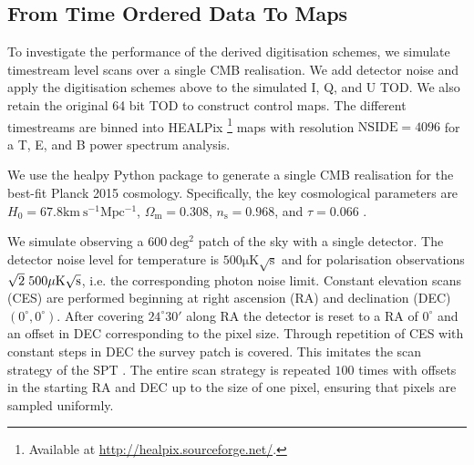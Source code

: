 \documentclass[apj]{emulateapj}
\begin{document}
\subsection{From Time Ordered Data To Maps}
\label{subsec:method}

To investigate the performance of the derived digitisation schemes, we simulate timestream level scans over a single CMB realisation. We add detector noise and apply the digitisation schemes above to the simulated I, Q, and U TOD. We also retain the original 64 bit TOD to construct control maps. The different timestreams are binned into HEALPix \citep{healpix}\footnote{Available at \url{http://healpix.sourceforge.net/}.} maps with resolution $\mathrm{NSIDE} = 4096$ for a T, E, and B power spectrum analysis.


We use the healpy Python package to generate a single CMB realisation for the best-fit Planck 2015 cosmology. Specifically, the key cosmological parameters are $H_0 = 67.8 \mathrm{km \> s^{-1} Mpc^{-1}}$, $\Omega_{\mathrm{m}} = 0.308 $, $n_{\mathrm{s}} = 0.968$, and $\tau = 0.066$ \citep{planck2016}.


We simulate observing a $600 \> \mathrm{ deg^2}$ patch of the sky with a single detector. The detector noise level for temperature is $500 \mathrm{\mu K \sqrt{s}}$ and for polarisation observations $\sqrt{2} \hspace{0.7ex} 500 \mathrm{\mu K \sqrt{s}}$, i.e. the corresponding photon noise limit. Constant elevation scans (CES) are performed beginning at right ascension (RA) and declination (DEC) $(0^\circ, 0^\circ)$. After covering $24^\circ30'$ along RA the detector is reset to a RA of $0^\circ$ and an offset in DEC corresponding to the pixel size. Through repetition of CES with constant steps in DEC the survey patch is covered. This imitates the scan strategy of the SPT \citep{schaffer2011}. The entire scan strategy is repeated $100$ times with offsets in the starting RA and DEC up to the size of one pixel, ensuring that pixels are sampled uniformly.
\end{document}
